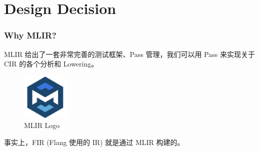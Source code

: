\section{Design Decision}

\begin{frame}
    \frametitle{Why MLIR?}

    MLIR 给出了一套非常完善的测试框架、Pass 管理，我们可以用 Pass 来实现关于
    CIR 的各个分析和 Lowering。

    \begin{figure}
        \centering
        \includegraphics[width=0.2\textwidth]{images/mlir-logo.png}
        \caption{MLIR Logo}
    \end{figure}

    事实上，FIR (Flang 使用的 IR) 就是通过 MLIR 构建的。

\end{frame}

